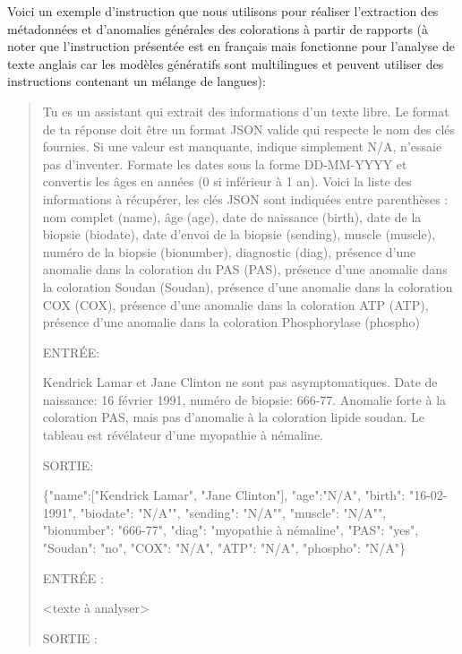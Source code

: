 Voici un exemple d'instruction que nous utilisons pour réaliser l'extraction des métadonnées et d'anomalies générales des colorations à partir de rapports (à noter que l'instruction présentée est en français mais fonctionne pour l'analyse de texte anglais car les modèles génératifs sont multilingues et peuvent utiliser des instructions contenant un mélange de langues):
\begin{quote}
Tu es un assistant qui extrait des informations d'un texte libre. Le format de ta réponse doit être un format JSON valide qui respecte le nom des clés fournies. Si une valeur est manquante, indique simplement N/A, n'essaie pas d'inventer. Formate les dates sous la forme DD-MM-YYYY et convertis les âges en années (0 si inférieur à 1 an). Voici la liste des informations à récupérer, les clés JSON sont indiquées entre parenthèses : nom complet (name), âge (age), date de naissance (birth), date de la biopsie (biodate), date d'envoi de la biopsie (sending), muscle (muscle), numéro de la biopsie (bionumber), diagnostic (diag), présence d'une anomalie dans la coloration du PAS (PAS), présence d'une anomalie dans la coloration Soudan (Soudan), présence d'une anomalie dans la coloration COX (COX), présence d'une anomalie dans la coloration ATP (ATP), présence d'une anomalie dans la coloration Phosphorylase (phospho)

ENTRÉE:

Kendrick Lamar et Jane Clinton ne sont pas asymptomatiques. Date de naissance: 16 février 1991, numéro de biopsie: 666-77. Anomalie forte à la coloration PAS, mais pas d'anomalie à la coloration lipide soudan. Le tableau est révélateur d'une myopathie à némaline.

SORTIE:

\{"name":["Kendrick Lamar", "Jane Clinton"], "age":"N/A", "birth": "16-02-1991", "biodate": "N/A"", "sending": "N/A"", "muscle": "N/A"", "bionumber": "666-77", "diag": "myopathie à némaline", "PAS": "yes", "Soudan": "no", "COX": "N/A", "ATP": "N/A", "phospho": "N/A"\}

ENTRÉE :

<texte à analyser>

SORTIE :
\end{quote}

